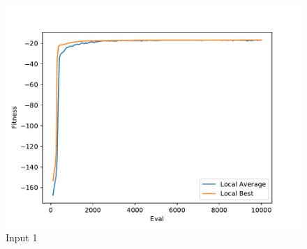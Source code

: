 \documentclass{standalone}
\begin{document}
\begin{figure}[!htb]
	\caption{Input 1}
	\label{fig:graph_1023}
	\includegraphics[width=\textwidth]{../graphs/graphs/1023.pdf}
\end{figure}
\end{document}
